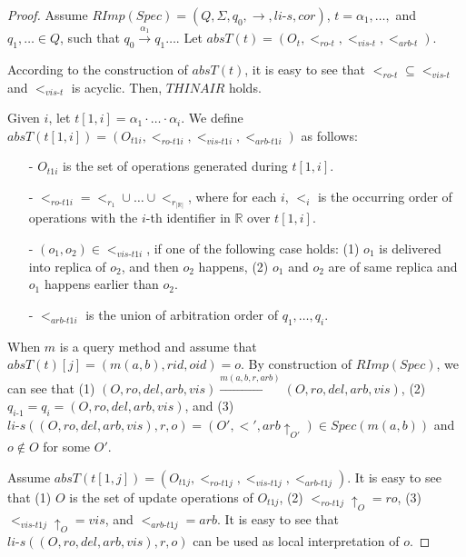 \begin {proof}

Assume $RImp(Spec) = (Q,\Sigma,q_0,\rightarrow,\textit{li-s},cor)$, $t = \alpha_1, \ldots, $ and $q_1,\ldots \in Q$, such that $q_0 {\xrightarrow{\alpha_1}} q_1 \ldots$. Let $absT(t) = (O_t,<_{\textit{ro-t}},<_{\textit{vis-t}},<_{\textit{arb-t}})$.

According to the construction of $absT(t)$, it is easy to see that $<_{\textit{ro-t}} \subseteq <_{\textit{vis-t}}$ and $<_{\textit{vis-t}}$ is acyclic. Then, $\textit{THINAIR}$ holds.

Given $i$, let $t[1,i] = \alpha_1 \cdot \ldots \cdot \alpha_i$. We define $absT(t[1,i]) = (O_\textit{t1i},<_{\textit{ro-t1i}},<_{\textit{vis-t1i}},<_{\textit{arb-t1i}})$ as follows:

\begin{itemize}
\setlength{\itemsep}{0.5pt}
\item[-] $O_\textit{t1i}$ is the set of operations generated during $t[1,i]$.

\item[-] $<_{\textit{ro-t1i}} = <_{r_1} \cup \ldots \cup <_{r_{\vert \mathbb{R} \vert}}$, where for each $i$, $<_i$ is the occurring order of operations with the $i$-th identifier in $\mathbb{R}$ over $t[1,i]$.

\item[-] $(o_1,o_2) \in <_{\textit{vis-t1i}}$, if one of the following case holds: (1) $o_1$ is delivered into replica of $o_2$, and then $o_2$ happens, (2) $o_1$ and $o_2$ are of same replica and $o_1$ happens earlier than $o_2$.

\item[-] $<_{\textit{arb-t1i}}$ is the union of arbitration order of $q_1,\ldots,q_i$.
\end{itemize}


When $m$ is a query method and assume that $absT(t)[j]=(m(a,b),rid,oid)=o$. By construction of $RImp(Spec)$, we can see that (1) $(O,ro,del,arb,vis) {\xrightarrow{m(a,b,r,arb)}} (O,ro,del,arb,vis)$, (2) $q_{\textit{i-1}} = q_i = (O,ro,del,arb,vis)$, and (3) $\textit{li-s}((O,ro,del,arb,vis),r,o) = (O',<',arb \uparrow_{O'}) \in Spec(m(a,b))$ and $o \notin O$ for some $O'$.

Assume $absT(t[1,j]) = (O_\textit{t1j},<_{\textit{ro-t1j}},<_{\textit{vis-t1j}},<_{\textit{arb-t1j}})$. It is easy to see that (1) $O$ is the set of update operations of $O_\textit{t1j}$, (2) $<_{\textit{ro-t1j}} \uparrow_{O} = ro$, (3) $<_{\textit{vis-t1j}} \uparrow_{O} = vis$, and $<_{\textit{arb-t1j}} = arb$. It is easy to see that $\textit{li-s}((O,ro,del,arb,vis),r,o)$ can be used as local interpretation of $o$.



\end{proof}
